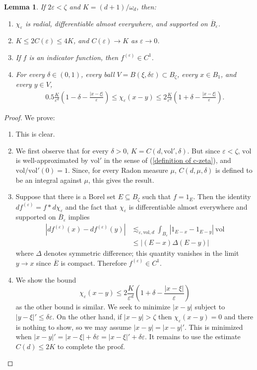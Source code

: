 \documentclass[reqno,12pt,letterpaper]{amsart}
\newcommand{\vol}{\mathrm{vol}}
\newtheorem{lemma}[theorem]{Lemma}
\theoremstyle{definition}
\numberwithin{equation}{section}
\begin{document}
\begin{lemma}\label{convolution fax}
If $2\varepsilon < \zeta$ and $K = (d+1)/\omega_d$, then:
\begin{enumerate}
\item $\chi_\varepsilon$ is radial, differentiable almost everywhere, and supported on $\overline B_\varepsilon$.
\item $K \leq 2C(\varepsilon) \leq 4K$, and $C(\varepsilon) \to K$ as $\varepsilon \to 0$.
\item If $f$ is an indicator function, then $f^{(\varepsilon)} \in C^1$.
\item For every $\delta \in (0, 1)$, every ball $V = B(\xi, \delta\varepsilon) \subset B_\zeta$, every $x \in B_1$, and every $y \in V$,
\begin{align*}
0.5\frac{K}{\varepsilon^d}\left(1 - \delta - \frac{|x - \xi|}{\varepsilon}\right) \leq \chi_\varepsilon(x - y) \leq 2\frac{K}{\varepsilon^d}\left(1 + \delta - \frac{|x - \xi|}{\varepsilon}\right).
\end{align*}
\end{enumerate}
\end{lemma}
\begin{proof}
We prove:
\begin{enumerate}
\item This is clear.
\item We first observe that for every $\delta > 0$, $K = C(d, \vol', \delta)$.
But since $\varepsilon < \zeta$, $\vol$ is well-approximated by $\vol'$ in the sense of (\ref{definition of c-zeta}), and $\vol/\vol'(0) = 1$.
Since, for every Radon measure $\mu$, $C(d, \mu, \delta)$ is defined to be an integral against $\mu$, this gives the result.
\item Suppose that there is a Borel set $E \subseteq B_\zeta$ such that $f = 1_E$. Then the identity $df^{(\varepsilon)} = f * d\chi_\varepsilon$ and the fact that $\chi_\varepsilon$ is differentiable almost everywhere and supported on $\overline B_\varepsilon$ implies
\begin{align*}
|df^{(\varepsilon)}(x) - df^{(\varepsilon)}(y)| &\lesssim_{\varepsilon,\vol,d} \int_{B_\varepsilon} |1_{E - x} - 1_{E - y}| ~\vol \\
&\leq |(E - x) \Delta (E - y)|
\end{align*}
where $\Delta$ denotes symmetric difference; this quantity vanishes in the limit $y \to x$ since $\overline E$ is compact. Therefore $f^{(\varepsilon)} \in C^1$.
\item We show the bound
$$\chi_\varepsilon(x - y) \leq 2\frac{K}{\varepsilon^d}\left(1 + \delta - \frac{|x - \xi|}{\varepsilon}\right)$$
as the other bound is similar.
We seek to minimize $|x - y|$ subject to $|y - \xi|' \leq \delta\varepsilon$.
On the other hand, if $|x - y| > \zeta$ then $\chi_\varepsilon(x - y) = 0$ and there is nothing to show, so we may assume $|x - y| = |x - y|'$.
This is minimized when $|x - y|' = |x - \xi| + \delta\varepsilon = |x - \xi|' + \delta\varepsilon$.
It remains to use the estimate $C(d) \leq 2K$ to complete the proof.
 \qedhere
\end{enumerate}
\end{proof}
\end{document}
